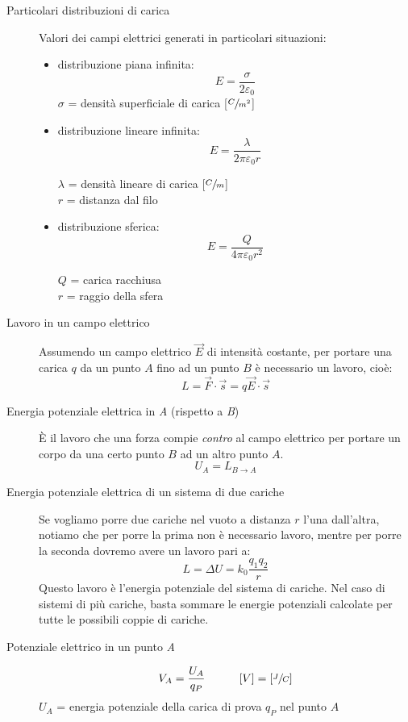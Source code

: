 \documentclass[a4paper,11pt,italian]{article}
\begin{document}
\begin{description}
  \item[Particolari distribuzioni di carica] Valori dei campi elettrici generati in particolari situazioni: 
    \begin{itemize}
    \item distribuzione piana infinita: 
      \[ E = \frac{\sigma}{2 \varepsilon_0} \]
      $ \sigma $ = densità superficiale di carica [$ \sfrac{C}{m^2} $]
    \item distribuzione lineare infinita: 
      \[ E = \frac{\lambda}{2 \pi \varepsilon_0 r} \]
      \begin{multicols}{2}
      $ \lambda $ = densità lineare di carica [$ \sfrac{C}{m} $]\\
      $ r $ = distanza dal filo
      \end{multicols}
    \item distribuzione sferica:
      \[ E = \frac{Q}{4 \pi \varepsilon_0 r^2} \]
      \begin{multicols}{2}
      $ Q $ = carica racchiusa\\
      $ r $ = raggio della sfera
      \end{multicols}
  \end{itemize}
  
  \item[Lavoro in un campo elettrico] 
  Assumendo un campo elettrico $ \vec{E} $ di intensità costante, per portare una carica $ q $ da un punto $ A $ fino ad un punto $ B $ è necessario un lavoro, cioè:
  \[ L = \vec{F} \cdot \vec{s} = q \vec{E} \cdot \vec{s}  \]
  
  \item[Energia potenziale elettrica in \textit{A} (rispetto a \textit{B})] 
  È il lavoro che una forza compie \emph{contro} al campo elettrico per portare un corpo da una certo punto $ B $ ad un altro punto $ A $.
  \[ U_A = L_{B\rightarrow A} \]
  
  \item[Energia potenziale elettrica di un sistema di due cariche] 
  Se vogliamo porre due cariche nel vuoto a distanza $ r $ l'una dall'altra, notiamo che per porre la prima non è necessario lavoro, mentre per porre la seconda dovremo avere un lavoro pari a:
  \[ L = \Delta U = k_0 \frac{q_1 q_2}{r}  \]
  Questo lavoro è l'energia potenziale del sistema di cariche. Nel caso di sistemi di più cariche, basta sommare le energie potenziali calcolate per tutte le possibili coppie di cariche.
  
  \item[Potenziale elettrico in un punto \textit{A}]
  \[ V_A = \frac{U_A}{q_P} \hspace*{3em} [V] =  \left[ \sfrac{J}{C} \right] \]
  $ U_A $ = energia potenziale della carica di prova $ q_P $ nel punto $ A $
  

\end{description}
\end{document}

